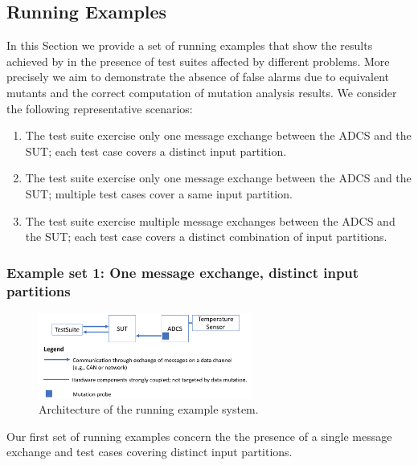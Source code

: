 \clearpage
\subsection{Running Examples}
\label{sec:dataDriven:example}

In this Section we provide a set of running examples that show the results achieved by \APPR in the presence of test suites affected by different problems. More precisely we aim to demonstrate the absence of false alarms due to equivalent mutants and the correct computation of mutation analysis results. We consider the following representative scenarios:
\begin{enumerate}
\item The test suite exercise only one message exchange between the ADCS and the SUT; each test case covers a distinct input partition.
\item The test suite exercise only one message exchange between the ADCS and the SUT; multiple test cases cover a same input partition.
\item The test suite exercise multiple message exchanges between the ADCS and the SUT; each test case covers a distinct combination of input partitions.
\end{enumerate}


\subsubsection{Example set 1: One message exchange, distinct input partitions}
\label{sec:dataDriven:example:1}

\begin{figure}[tb]
\centering
\includegraphics[width=7cm]{damat/RunningExampleArch}
\caption{Architecture of the running example system.}
\label{fig:damat:RunningExampleArch}
\end{figure}

Our first set of running examples concern the the presence of a single message exchange and test cases covering distinct input partitions.

